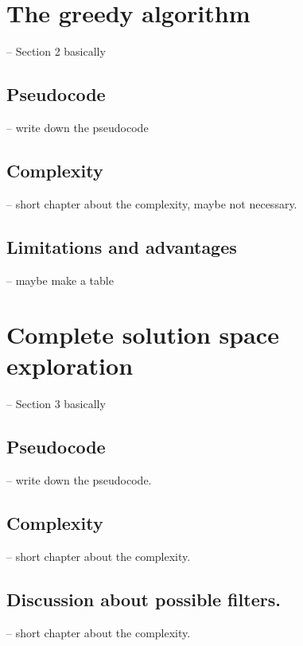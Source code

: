 \documentclass[parskip=full]{scrartcl}
\begin{document}
\section{The greedy algorithm}
-- Section 2 basically

\subsection{Pseudocode}
-- write down the pseudocode

\subsection{Complexity}
-- short chapter about the complexity, maybe not necessary.

\subsection{Limitations and advantages}
-- maybe make a table


\section{Complete solution space exploration}
-- Section 3 basically

\subsection{Pseudocode}
-- write down the pseudocode.

\subsection{Complexity}
-- short chapter about the complexity.

\subsection{Discussion about possible filters.}
-- short chapter about the complexity.

\clearpage

\printglossaries
\end{document}
